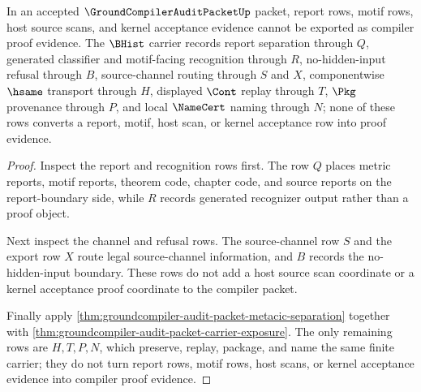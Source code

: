 \begin{theorem}
\label{thm:groundcompiler-audit-packet-refusal-separation}
In an accepted $\GroundCompilerAuditPacketUp$ packet, report rows, motif rows, host source scans, and kernel acceptance evidence cannot be exported as compiler proof evidence. The $\BHist$ carrier records report separation through $Q$, generated classifier and motif-facing recognition through $R$, no-hidden-input refusal through $B$, source-channel routing through $S$ and $X$, componentwise $\hsame$ transport through $H$, displayed $\Cont$ replay through $T$, $\Pkg$ provenance through $P$, and local $\NameCert$ naming through $N$; none of these rows converts a report, motif, host scan, or kernel acceptance row into proof evidence.
\end{theorem}
\begin{proof}
Inspect the report and recognition rows first. The row $Q$ places metric reports, motif reports, theorem code, chapter code, and source reports on the report-boundary side, while $R$ records generated recognizer output rather than a proof object.

Next inspect the channel and refusal rows. The source-channel row $S$ and the export row $X$ route legal source-channel information, and $B$ records the no-hidden-input boundary. These rows do not add a host source scan coordinate or a kernel acceptance proof coordinate to the compiler packet.

Finally apply \autoref{thm:groundcompiler-audit-packet-metacic-separation} together with \autoref{thm:groundcompiler-audit-packet-carrier-exposure}. The only remaining rows are $H,T,P,N$, which preserve, replay, package, and name the same finite carrier; they do not turn report rows, motif rows, host scans, or kernel acceptance evidence into compiler proof evidence.
\end{proof}

